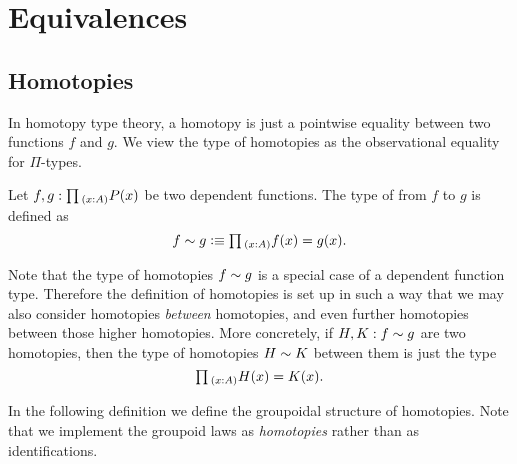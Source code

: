 
\section{Equivalences}

\subsection{Homotopies}
In homotopy type theory, a homotopy is just a pointwise equality between two functions $f$ and $g$. We view the type of homotopies as the observational equality for $\Pi$-types.

\begin{defn}
Let $f,g:\prd{x:A}P(x)$ be two dependent functions. The type of  from $f$ to $g$ is defined as
\begin{equation*}
f\htpy g \defeq \prd{x:A} f(x)=g(x).
\end{equation*}
\end{defn}

Note that the type of homotopies $f\sim g$ is a special case of a dependent function type. Therefore the definition of homotopies is set up in such a way that we may also consider homotopies \emph{between} homotopies, and even further homotopies between those higher homotopies. More concretely, if $H,K:f\sim g$ are two homotopies, then the type of homotopies $H\sim K$ between them is just the type
\begin{equation*}
\prd{x:A} H(x)=K(x).
\end{equation*}

In the following definition we define the groupoidal structure of homotopies. Note that we implement the groupoid laws as \emph{homotopies} rather than as identifications.

